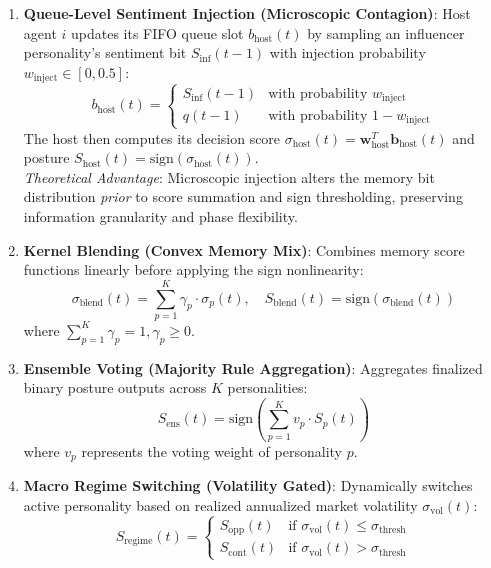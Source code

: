 \documentclass[11pt,a4paper]{article}
\begin{document}
\begin{enumerate}
    \item \textbf{Queue-Level Sentiment Injection (Microscopic Contagion)}:
    Host agent $i$ updates its FIFO queue slot $b_{\text{host}}(t)$ by sampling an influencer personality's sentiment bit $S_{\text{inf}}(t-1)$ with injection probability $w_{\text{inject}} \in [0, 0.5]$:
    \begin{equation}
        b_{\text{host}}(t) = 
        \begin{cases} 
            S_{\text{inf}}(t-1) & \text{with probability } w_{\text{inject}} \\ 
            q(t-1) & \text{with probability } 1 - w_{\text{inject}} 
        \end{cases}
    \end{equation}
    The host then computes its decision score $\sigma_{\text{host}}(t) = \mathbf{w}_{\text{host}}^T \mathbf{b}_{\text{host}}(t)$ and posture $S_{\text{host}}(t) = \text{sign}(\sigma_{\text{host}}(t))$. \\
    \textit{Theoretical Advantage}: Microscopic injection alters the memory bit distribution \textit{prior} to score summation and sign thresholding, preserving information granularity and phase flexibility.

    \item \textbf{Kernel Blending (Convex Memory Mix)}:
    Combines memory score functions linearly before applying the sign nonlinearity:
    \begin{equation}
        \sigma_{\text{blend}}(t) = \sum_{p=1}^K \gamma_p \cdot \sigma_p(t), \quad S_{\text{blend}}(t) = \text{sign}\left( \sigma_{\text{blend}}(t) \right)
    \end{equation}
    where $\sum_{p=1}^K \gamma_p = 1, \gamma_p \ge 0$.

    \item \textbf{Ensemble Voting (Majority Rule Aggregation)}:
    Aggregates finalized binary posture outputs across $K$ personalities:
    \begin{equation}
        S_{\text{ens}}(t) = \text{sign}\left( \sum_{p=1}^K v_p \cdot S_p(t) \right)
    \end{equation}
    where $v_p$ represents the voting weight of personality $p$.

    \item \textbf{Macro Regime Switching (Volatility Gated)}:
    Dynamically switches active personality based on realized annualized market volatility $\sigma_{\text{vol}}(t)$:
    \begin{equation}
        S_{\text{regime}}(t) = 
        \begin{cases} 
            S_{\text{opp}}(t) & \text{if } \sigma_{\text{vol}}(t) \le \sigma_{\text{thresh}} \\ 
            S_{\text{cont}}(t) & \text{if } \sigma_{\text{vol}}(t) > \sigma_{\text{thresh}} 
        \end{cases}
    \end{equation}
\end{enumerate}
\end{document}
